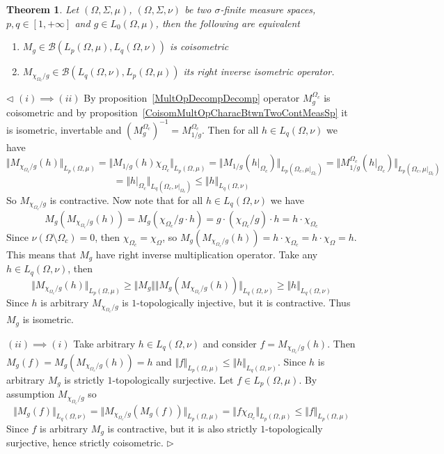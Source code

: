 \documentclass[12pt]{article}
\newtheorem{theorem}{Theorem}[subsection]
\newenvironment{proof}{\par $\triangleleft$}{$\triangleright$}
\begin{document}
\begin{theorem}\label{CoisomMultOpDescBtwnTwoMeasSp}
    Let $(\Omega,\Sigma,\mu)$, $(\Omega,\Sigma,\nu)$ be two $\sigma$-finite
    measure spaces, $p,q\in[1,+\infty]$ and $g\in L_0(\Omega,\mu)$, then the
    following are equivalent
    \begin{enumerate}[label = (\roman*)]
        \item $M_g\in\mathcal{B}(L_p(\Omega,\mu),L_q(\Omega,\nu))$ is
              coisometric

        \item $M_{\chi_{\Omega_c}/g}
                  \in\mathcal{B}(L_q(\Omega,\nu), L_p(\Omega,\mu))$ its right inverse
              isometric operator.
    \end{enumerate}
\end{theorem}
\begin{proof}
    $(i)\implies (ii)$ By proposition~\ref{MultOpDecompDecomp} operator
    $M_g^{\Omega_c}$ is coisometric and by
    proposition~\ref{CoisomMultOpCharacBtwnTwoContMeasSp} it is isometric,
    invertable and ${(M_g^{\Omega_c})}^{-1}=M_{1/g}^{\Omega_c}$. Then for
    all $h\in L_q(\Omega,\nu)$ we have
    $$
        \Vert M_{\chi_{\Omega_c}/g}(h)\Vert_{L_p(\Omega,\mu)}= \Vert
        M_{1/g}(h)\chi_{\Omega_c}\Vert_{L_p(\Omega,\mu)}= \Vert
        M_{1/g}(h|_{\Omega_c})\Vert_{L_p(\Omega_c,\mu|_{\Omega_c})}= \Vert
        M_{1/g}^{\Omega_c}(h|_{\Omega_c})\Vert_{L_p(\Omega_c,\mu|_{\Omega_c})}
    $$
    $$
        =\Vert h|_{\Omega_c}\Vert_{L_q(\Omega_c,\nu|_{\Omega_c})} \leq\Vert
        h\Vert_{L_q(\Omega,\nu)}
    $$
    So $M_{\chi_{\Omega_c}/g}$ is contractive. Now note that for all
    $h\in L_q(\Omega,\nu)$ we have
    $$
        M_g(M_{\chi_{\Omega_c}/g}(h)) =M_g(\chi_{\Omega_c}/g\cdot h)
        =g\cdot(\chi_{\Omega_c}/g)\cdot  h =h\cdot\chi_{\Omega_c}
    $$
    Since $\nu(\Omega\setminus\Omega_c)=0$, then
    $\chi_{\Omega_c}=\chi_{\Omega}$, so
    $M_g(M_{\chi_{\Omega_c}/g}(h))=h\cdot\chi_{\Omega_c}=h\cdot\chi_{\Omega}=h$.
    This means that $M_g$ have right inverse multiplication operator. Take any
    $h\in L_q(\Omega,\nu)$, then
    $$
        \Vert M_{\chi_{\Omega_c}/g}(h)\Vert_{L_p(\Omega,\mu)} \geq\Vert
        M_g\Vert\Vert M_g(M_{\chi_{\Omega_c}/g}(h))\Vert_{L_q(\Omega,\nu)}
        \geq\Vert h\Vert_{L_q(\Omega,\nu)}
    $$
    Since $h$ is arbitrary $M_{\chi_{\Omega_c}/g}$ is $1$-topologically
    injective, but it is contractive. Thus $M_g$ is isometric.

    $(ii)\implies (i)$ Take arbitrary $h\in L_q(\Omega,\nu)$ and
    consider $f=M_{\chi_{\Omega_c}/g}(h)$. Then
    $M_g(f)=M_g(M_{\chi_{\Omega_c}/g}(h))=h$ and
    $\Vert f\Vert_{L_p(\Omega,\mu)}\leq\Vert h\Vert_{L_q(\Omega,\nu)}$. Since
    $h$ is arbitrary $M_g$ is strictly $1$-topologically surjective. Let
    $f\in L_p(\Omega,\mu)$. By assumption $M_{\chi_{\Omega_c}/g}$ so
    $$
        \Vert M_g(f)\Vert_{L_q(\Omega,\nu)} =\Vert
        M_{\chi_{\Omega_c}/g}(M_g(f))\Vert_{L_p(\Omega,\mu)} =\Vert
        f\chi_{\Omega_c}\Vert_{L_p(\Omega,\mu)} \leq\Vert
        f\Vert_{L_p(\Omega,\mu)}
    $$
    Since $f$ is arbitrary $M_g$ is contractive, but it is also strictly
    $1$-topologically surjective, hence strictly coisometric.
\end{proof}
\end{document}

